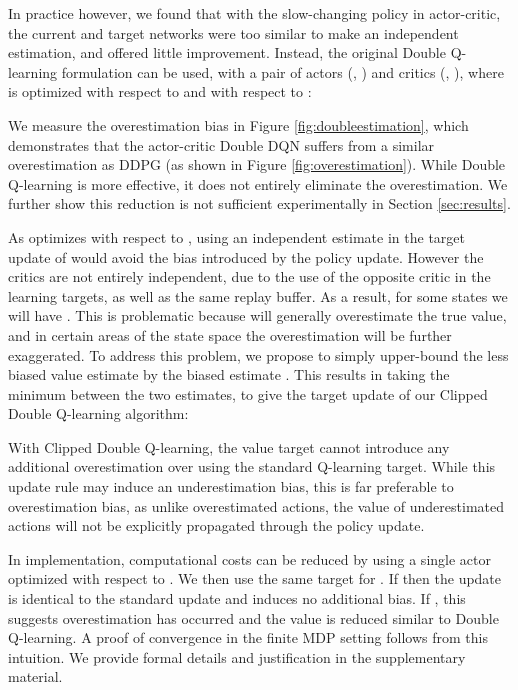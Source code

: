 \documentclass{article}
\begin{document}
In practice however, we found that with the slow-changing policy in actor-critic, the current and target networks were too similar to make an independent estimation, and offered little improvement.
Instead, the original Double Q-learning formulation can be used, with a pair of actors (, ) and critics (, ), where  is optimized with respect to  and  with respect to :

We measure the overestimation bias in Figure \ref{fig:doubleestimation}, which demonstrates that the actor-critic Double DQN suffers from a similar overestimation as DDPG (as shown in Figure \ref{fig:overestimation}). While Double Q-learning is more effective, it does not entirely eliminate the overestimation. We further show this reduction is not sufficient experimentally in Section \ref{sec:results}. 

As  optimizes with respect to , using an independent estimate in the target update of  would avoid the bias introduced by the policy update. 
However the critics are not entirely independent, due to the use of the opposite critic in the learning targets, as well as the same replay buffer. As a result, for some states  we will have . 
This is problematic because  will generally overestimate the true value, and in certain areas of the state space the overestimation will be further exaggerated.  
To address this problem, we propose to simply upper-bound the less biased value estimate  by the biased estimate . This results in taking the minimum between the two estimates, to give the target update of our Clipped Double Q-learning algorithm: 

With Clipped Double Q-learning, the value target cannot introduce any additional overestimation over using the standard Q-learning target. 
While this update rule may induce an underestimation bias, this is far preferable to overestimation bias, as unlike overestimated actions, the value of underestimated actions will not be explicitly propagated through the policy update. 



In implementation, computational costs can be reduced by using a single actor optimized with respect to . We then use the same target  for . If  then the update is identical to the standard update and induces no additional bias. If , this suggests overestimation has occurred and the value is reduced similar to Double Q-learning. A proof of convergence in the finite MDP setting follows from this intuition. We provide formal details and justification in the supplementary material.
\end{document}
